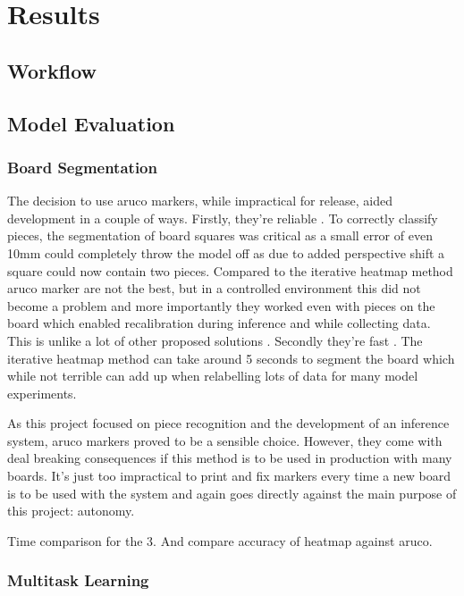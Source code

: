 \chapter{Results}
\label{results}

\section{Workflow}


\section{Model Evaluation}


\subsection{Board Segmentation}
The decision to use aruco markers, while impractical for release, aided development in a couple of ways.  Firstly, they're reliable \cite{}.
To correctly classify pieces, the segmentation of board squares was critical as a small error of even 10mm could completely throw the
model off as due to added perspective shift a square could now contain two pieces.  Compared to the iterative heatmap method \cite{} aruco 
marker are not the best, but in a controlled environment this did not become a problem and more importantly they worked even with pieces on the
board which enabled recalibration during inference and while collecting data.  This is unlike a lot of other proposed solutions \cite{}.
Secondly they're fast \cite{}.  The iterative heatmap method can take around 5 seconds to segment the board which while not terrible can add up when 
relabelling lots of data for many model experiments.

As this project focused on piece recognition and the development of an inference system, aruco markers proved to be a sensible choice.  However, 
they come with deal breaking consequences if this method is to be used in production with many boards.  It's just too impractical to print and fix
markers every time a new board is to be used with the system and again goes directly against the main purpose of this project: autonomy.

Time comparison for the 3.  And compare accuracy of heatmap against aruco.

\subsection{Multitask Learning}


